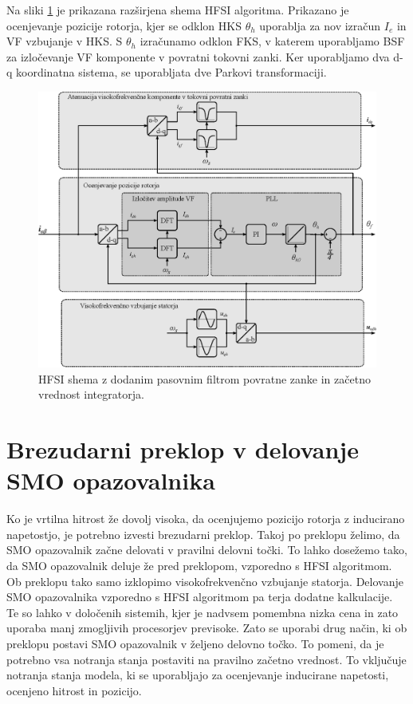 \documentclass[a4paper,twoside,openright,12pt,slovene]{book}
\begin{document}
\newpage

Na sliki \ref{HFSI} je prikazana razširjena shema HFSI algoritma. Prikazano je ocenjevanje pozicije rotorja, kjer se odklon HKS $\theta_h$ uporablja za nov izračun $I_e$ in VF vzbujanje v HKS. S
$\theta_h$ izračunamo odklon FKS, v katerem uporabljamo BSF za izločevanje VF komponente v povratni tokovni zanki. Ker uporabljamo dva d-q koordinatna sistema, se uporabljata dve Parkovi
transformaciji.

\begin{figure}[!htbp]
    \centering
    \includegraphics[width=0.95\columnwidth]{Slike/Inkscape/HFSI.eps}
    \caption{\label{HFSI} HFSI shema z dodanim pasovnim filtrom povratne zanke in začetno vrednost integratorja. }
\end{figure}

\newpage

\section{Brezudarni preklop v delovanje SMO opazovalnika}

Ko je vrtilna hitrost že dovolj visoka, da ocenjujemo pozicijo rotorja z inducirano napetostjo, je potrebno izvesti brezudarni preklop. Takoj po preklopu želimo,
da SMO opazovalnik začne delovati v pravilni delovni točki. To lahko dosežemo tako, da SMO opazovalnik deluje že pred preklopom, vzporedno s HFSI algoritmom. Ob preklopu tako samo izklopimo visokofrekvenčno
vzbujanje statorja. Delovanje SMO opazovalnika vzporedno s HFSI algoritmom pa terja dodatne kalkulacije. Te so lahko v določenih sistemih, kjer je nadvsem pomembna nizka cena in zato uporaba manj
zmogljivih procesorjev previsoke. Zato se uporabi drug način, ki ob preklopu postavi SMO opazovalnik v željeno delovno točko. To pomeni, da je potrebno vsa notranja stanja postaviti na pravilno
začetno vrednost. To vključuje notranja stanja modela, ki se uporabljajo za ocenjevanje inducirane napetosti, ocenjeno hitrost in pozicijo.
\end{document}
